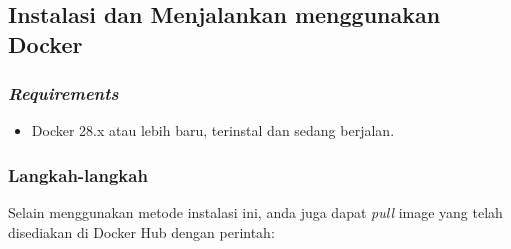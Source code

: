 \documentclass{article}
\begin{document}
    \subsection{Instalasi dan Menjalankan menggunakan Docker}

    \subsubsection{\textit{Requirements}}
    \begin{itemize}
        \item Docker 28.x atau lebih baru, terinstal dan sedang berjalan.
    \end{itemize}

    \subsubsection{Langkah-langkah}
    Selain menggunakan metode instalasi ini, anda juga dapat \textit{pull} image yang telah disediakan di Docker Hub dengan perintah:
\end{document}
